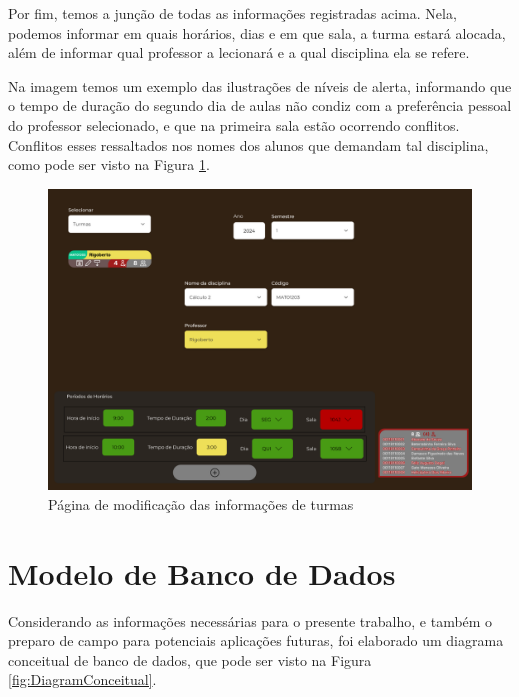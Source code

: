 Por fim, temos a junção de todas as informações registradas acima. Nela, podemos informar em quais horários, dias e em que sala, a turma estará alocada, além de informar qual professor a lecionará e a qual disciplina ela se refere.

Na imagem temos um exemplo das ilustrações de níveis de alerta, informando que o tempo de duração do segundo dia de aulas não condiz com a preferência pessoal do professor selecionado, e que na primeira sala estão ocorrendo conflitos. Conflitos esses ressaltados nos nomes dos alunos que demandam tal disciplina, como pode ser visto na Figura \ref{fig:CRUD_turmas}.

\begin{figure}[htbp]\centering
  \caption{\label{fig:CRUD_turmas} Página de modificação das informações de turmas}
  \includegraphics[scale=0.6]{files/img/Prototipo/Medio/CRUD_turmas.png}
\end{figure} %

\section{Modelo de Banco de Dados} %

Considerando as informações necessárias para o presente trabalho, e também o preparo de campo para potenciais aplicações futuras, foi elaborado um diagrama conceitual de banco de dados, que pode ser visto na Figura \ref{fig:DiagramConceitual}.

